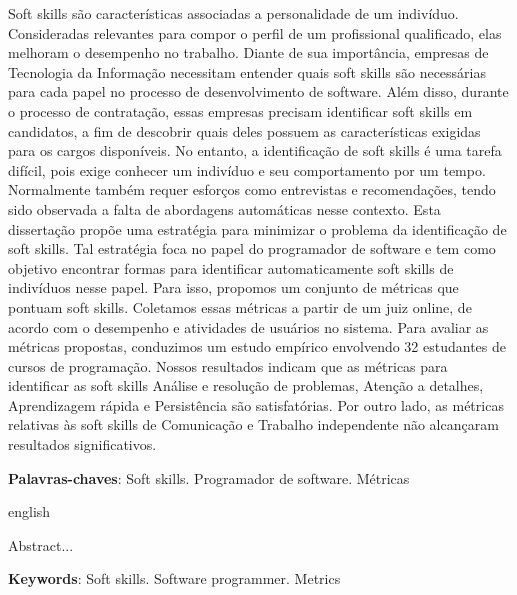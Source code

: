 \documentclass{ppgi}
\begin{document}
\begin{resumo}

Soft skills são características associadas a personalidade de um indivíduo.
Consideradas relevantes para compor o perfil de um profissional qualificado, elas melhoram o desempenho no trabalho.
Diante de sua importância, empresas de Tecnologia da Informação necessitam entender quais soft skills são necessárias para cada papel no processo de desenvolvimento de software.
Além disso, durante o processo de contratação, essas empresas precisam identificar soft skills em candidatos, a fim de descobrir quais deles possuem as características exigidas para os cargos disponíveis.
No entanto, a identificação de soft skills é uma tarefa difícil, pois exige conhecer um indivíduo e seu comportamento por um tempo. 
Normalmente também requer esforços como entrevistas e recomendações, tendo sido observada a falta de abordagens automáticas nesse contexto.
Esta dissertação propõe uma estratégia para minimizar o problema da identificação de soft skills.
Tal estratégia foca no papel do programador de software e tem como objetivo encontrar formas para identificar automaticamente soft skills de indivíduos nesse papel.
Para isso, propomos um conjunto de métricas que pontuam soft skills.
Coletamos essas métricas a partir de um juiz online, de acordo com o desempenho e atividades de usuários no sistema.
Para avaliar as métricas propostas, conduzimos um estudo empírico envolvendo 32 estudantes de cursos de programação.
Nossos resultados indicam que as métricas para identificar as soft skills Análise e resolução de problemas, Atenção a detalhes, Aprendizagem rápida e Persistência são satisfatórias.
Por outro lado, as métricas relativas às soft skills de Comunicação e Trabalho independente não alcançaram resultados significativos.

\posresumo

\textbf{Palavras-chaves}: Soft skills. Programador de software. Métricas
\end{resumo}

\begin{resumo}[Abstract]
\begin{otherlanguage*}{english}

Abstract...

\posresumo

\textbf{Keywords}: Soft skills. Software programmer. Metrics
\end{otherlanguage*}
\end{resumo}
\end{document}
